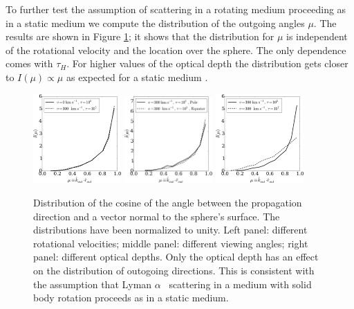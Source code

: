 \documentclass{emulateapj}
\newcommand{\lya}{{Lyman $\alpha$~}}
\begin{document}
To further test the assumption of scattering in a rotating medium proceeding
as in a static medium we compute the distribution of the outgoing
angles $\mu$. The results are shown in Figure \ref{fig:surface}; it
shows that the distribution for $\mu$ is independent of the rotational
velocity and the location over the sphere. The only dependence comes
with $\tau_{H}$. For higher values of the optical depth the
distribution gets closer to $I(\mu)\propto \mu$ as expected for a
static medium \citep{Ahn01}.

%
\begin{figure}[h]
\centerline{
\includegraphics[width=0.30\textwidth]{fig12a.pdf}
\includegraphics[width=0.30\textwidth]{fig12b.pdf}
\includegraphics[width=0.30\textwidth]{fig12c.pdf}}
\caption[]{Distribution of the cosine of the angle between the
  propagation direction and a vector normal to the sphere's
  surface. The distributions have been normalized to unity. Left
  panel: different rotational velocities; middle panel: different
  viewing angles; right panel: different optical depths. Only the
  optical depth has an effect on the distribution of outogoing
  directions. This is consistent with the assumption that \lya
  scattering in a medium with solid body rotation proceeds as in a
  static medium.} 
\label{fig:surface}
\end{figure} 
%
\end{document}

